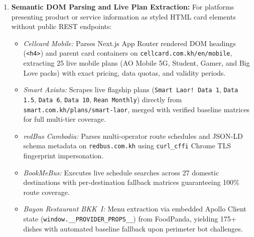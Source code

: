 \begin{enumerate}
    \item \textbf{Semantic DOM Parsing and Live Plan Extraction:} For platforms presenting product or service information as styled HTML card elements without public REST endpoints:
    \begin{itemize}[noitemsep]
        \item \textit{Cellcard Mobile:} Parses Next.js App Router rendered DOM headings (\texttt{<h4>}) and parent card containers on \texttt{cellcard.com.kh/en/mobile}, extracting 25 live mobile plans (AO Mobile 5G, Student, Gamer, and Big Love packs) with exact pricing, data quotas, and validity periods.
        \item \textit{Smart Axiata:} Scrapes live flagship plans (\texttt{Smart Laor! Data 1}, \texttt{Data 1.5}, \texttt{Data 6}, \texttt{Data 10}, \texttt{Rean Monthly}) directly from \texttt{smart.com.kh/plans/smart-laor}, merged with verified baseline matrices for full multi-tier coverage.
        \item \textit{redBus Cambodia:} Parses multi-operator route schedules and JSON-LD schema metadata on \texttt{redbus.com.kh} using \texttt{curl\_cffi} Chrome TLS fingerprint impersonation.
        \item \textit{BookMeBus:} Executes live schedule searches across 27 domestic destinations with per-destination fallback matrices guaranteeing 100\% route coverage.
        \item \textit{Bayon Restaurant BKK~I:} Menu extraction via embedded Apollo Client state (\texttt{window.\_\_PROVIDER\_PROPS\_\_}) from FoodPanda, yielding 175+ dishes with automated baseline fallback upon perimeter bot challenges.
    \end{itemize}


\end{enumerate}
